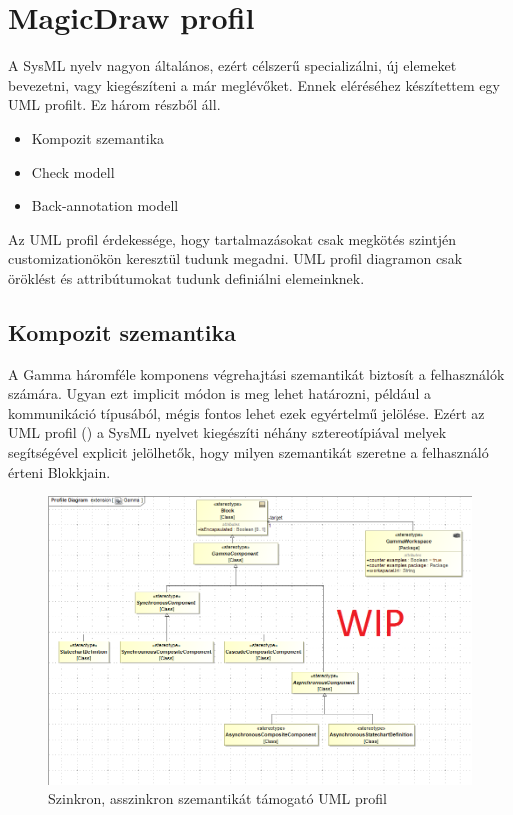 \section{MagicDraw profil}

A SysML nyelv nagyon általános, ezért célszerű specializálni, új elemeket bevezetni, vagy kiegészíteni a már meglévőket. Ennek eléréséhez készítettem egy UML profilt. Ez három részből áll.

\begin{itemize}
	\item Kompozit szemantika
	\item Check modell
	\item Back-annotation modell
\end{itemize}
Az UML profil érdekessége, hogy tartalmazásokat csak megkötés szintjén customizationökön keresztül tudunk megadni. UML profil diagramon csak öröklést és attribútumokat tudunk definiálni elemeinknek.

\newpage

\subsection{Kompozit szemantika}

A Gamma háromféle komponens végrehajtási szemantikát biztosít a felhasználók számára. Ugyan ezt implicit módon is meg lehet határozni, például a kommunikáció típusából, mégis fontos lehet ezek egyértelmű jelölése. Ezért az UML profil () a SysML nyelvet kiegészíti néhány sztereotípiával melyek segítségével explicit jelölhetők, hogy milyen szemantikát szeretne a felhasználó érteni Blokkjain.

\begin{figure}[!ht]
	\centering
	\includegraphics[width=150mm, keepaspectratio]{figures/contribution/profile.png}
	\caption{Szinkron, asszinkron szemantikát támogató UML profil}
	\label{fig:comp-prof}
\end{figure}

